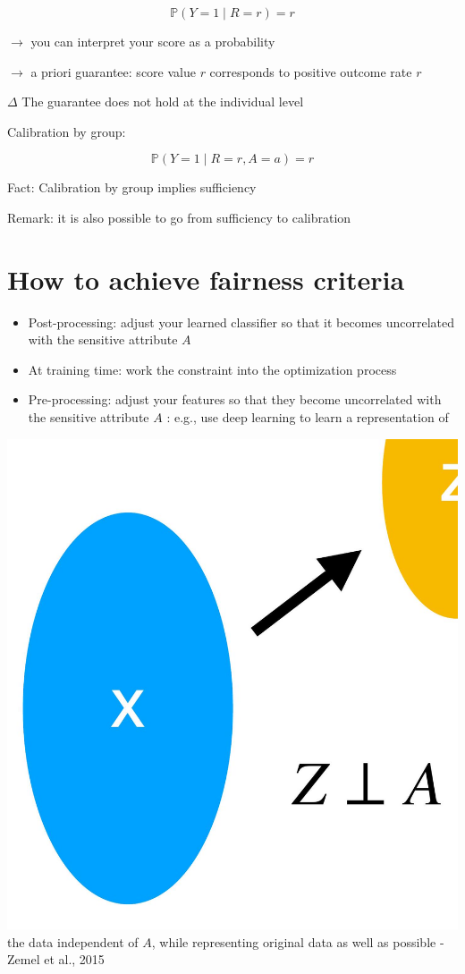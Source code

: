 \documentclass[10pt]{article}
\begin{document}
$$
\mathbb{P}(Y=1 \mid R=r)=r
$$

$\rightarrow$ you can interpret your score as a probability

$\rightarrow$ a priori guarantee: score value $r$ corresponds to positive outcome rate $r$

$\Delta$ The guarantee does not hold at the individual level

Calibration by group:

$$
\mathbb{P}(Y=1 \mid R=r, A=a)=r
$$

Fact: Calibration by group implies sufficiency

Remark: it is also possible to go from sufficiency to calibration

\section*{How to achieve fairness criteria}
\begin{itemize}
  \item Post-processing: adjust your learned classifier so that it becomes uncorrelated with the sensitive attribute $A$

  \item At training time: work the constraint into the optimization process

  \item Pre-processing: adjust your features so that they become uncorrelated with the sensitive attribute $A$ : e.g., use deep learning to learn a representation of

\end{itemize}

\includegraphics[max width=\textwidth, center]{2024_01_08_7c1a383b1e6170f910e4g-30}
the data independent of $A$, while representing original data as well as possible - Zemel et al., 2015
\end{document}
